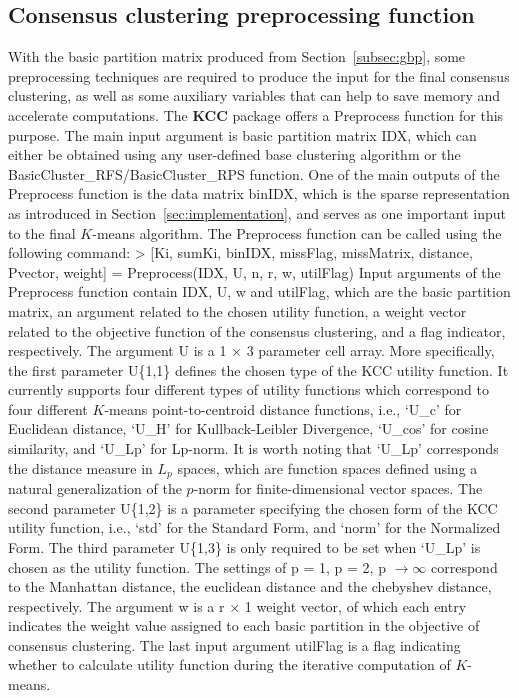 \documentclass[acmsmall,screen,review]{acmart}
\begin{document}
\subsection{Consensus clustering preprocessing function}\label{subsec:prepro}
With the basic partition matrix produced from Section~\ref{subsec:gbp}, some preprocessing techniques are required to produce the input for the final consensus clustering, as well as some auxiliary variables that can help to save memory and accelerate computations. The \textbf{KCC} package offers a \textsf{Preprocess} function for this purpose. The main input argument is basic partition matrix \textsf{IDX}, which can either be obtained using any user-defined base clustering algorithm or the \textsf{BasicCluster\_RFS/BasicCluster\_RPS} function. One of the main outputs of the \textsf{Preprocess} function is the data matrix \textsf{binIDX}, which is the sparse representation as introduced in Section~\ref{sec:implementation}, and serves as one important input to the final $K$-means algorithm. The \textsf{Preprocess} function can be called using the following command:
\newline
\newline
\textsf{> [Ki, sumKi, binIDX, missFlag, missMatrix, distance, Pvector, weight] = Preprocess(IDX, U, n, r, w, utilFlag)}
\newline
\newline
Input arguments of the \textsf{Preprocess} function contain \textsf{IDX}, \textsf{U}, \textsf{w} and \textsf{utilFlag}, which are the basic partition matrix, an argument related to the chosen utility function, a weight vector related to the objective function of the consensus clustering, and a flag indicator, respectively. The argument \textsf{U} is a \textsf{1} $\times$ \textsf{3} parameter cell array. More specifically, the first parameter \textsf{U\{1,1\}} defines the chosen type of the KCC utility function. It currently supports four different types of utility functions which correspond to four different $K$-means point-to-centroid distance functions, i.e., \textsf{`U\_c'} for Euclidean distance, \textsf{`U\_H'} for Kullback-Leibler Divergence, \textsf{`U\_cos'} for cosine similarity, and \textsf{`U\_Lp'} for Lp-norm. It is worth noting that \textsf{`U\_Lp'} corresponds the distance measure in $L_p$ spaces, which are function spaces defined using a natural generalization of the $p$-norm for finite-dimensional vector spaces. The second parameter \textsf{U\{1,2\}} is a parameter specifying the chosen form of the KCC utility function, i.e., \textsf{`std'} for the Standard Form, and \textsf{`norm'} for the Normalized Form. The third parameter \textsf{U\{1,3\}} is only required to be set when \textsf{`U\_Lp'} is chosen as the utility function. The settings of \textsf{p = 1}, \textsf{p = 2}, \textsf{p} $\rightarrow \infty$ correspond to the Manhattan distance, the euclidean distance and the chebyshev distance, respectively. The argument \textsf{w} is a \textsf{r} $\times$ \textsf{1} weight vector, of which each entry indicates the weight value assigned to each basic partition in the objective of consensus clustering. The last input argument \textsf{utilFlag} is a flag indicating whether to calculate utility function during the iterative computation of $K$-means.
\end{document}
